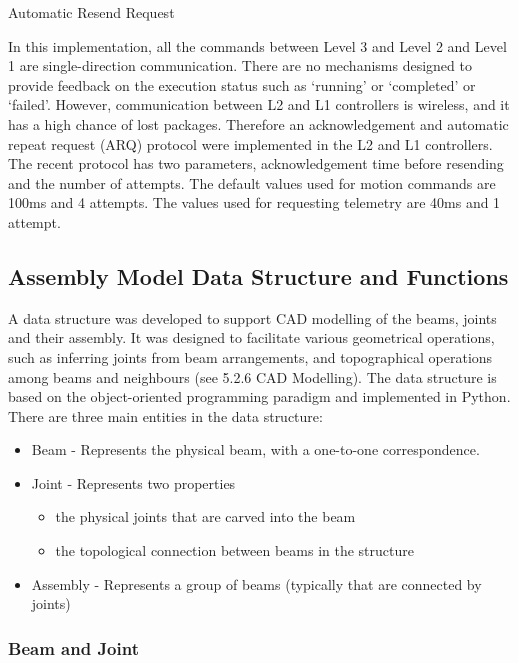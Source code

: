 Automatic Resend Request

In this implementation, all the commands between Level 3 and Level 2 and Level 1 are single-direction communication. There are no mechanisms designed to provide feedback on the execution status such as ‘running’ or ‘completed’ or ‘failed’. However, communication between L2 and L1 controllers is wireless, and it has a high chance of lost packages. Therefore an acknowledgement and automatic repeat request (ARQ) protocol were implemented in the L2 and L1 controllers. The recent protocol has two parameters, acknowledgement time before resending and the number of attempts. The default values used for motion commands are 100ms and 4 attempts. The values used for requesting telemetry are 40ms and 1 attempt. 

\subsection{Assembly Model Data Structure and Functions}
\label{subsection:exploration_2_assembly_model_data_structure_and_functions}

A data structure was developed to support CAD modelling of the beams, joints and their assembly. It was designed to facilitate various geometrical operations, such as inferring joints from beam arrangements, and topographical operations among beams and neighbours (see 5.2.6 CAD Modelling). The data structure is based on the object-oriented programming paradigm and implemented in Python. 
There are three main entities in the data structure:
\begin{itemize}
    \item Beam - Represents the physical beam, with a one-to-one correspondence.
    \item Joint - Represents two properties 
    \begin{itemize}
        \item the physical joints that are carved into the beam
        \item the topological connection between beams in the structure
    \end{itemize}
    \item Assembly - Represents a group of beams (typically that are connected by joints)
\end{itemize}

\subsubsection{Beam and Joint}
\label{subsubsection:exploration_2_beam_and_joint}

